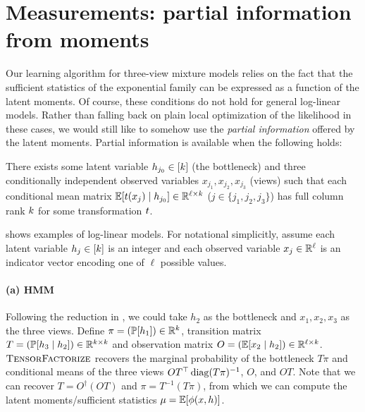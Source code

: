 \section{Measurements: partial information from moments} \label{sec:generalModels}

Our learning algorithm for three-view mixture models relies on the fact that
the sufficient statistics of the exponential family
can be expressed as a function of the latent moments.
Of course, these conditions do not hold for general log-linear models.
Rather than falling back on plain local optimization of the likelihood in these
cases, we would still like
to somehow use the \emph{partial information} offered by the latent moments.
Partial information is available when the following holds:
\begin{property}
  There exists some latent variable $h_{j_0} \in [k]$ (the bottleneck)
  and three conditionally independent observed variables $x_{j_1},x_{j_2},x_{j_3}$ (views) such that
  each conditional mean matrix $\mathbb{E}[t(x_{j}) \mid h_{j_0}] \in \mathbb{R}^{\ell \times k}$ ($j \in \{ j_1, j_2, j_3 \}$) has full column rank $k$
  for some transformation $t$.
\end{property}

 shows examples of log-linear models.
For notational simplicitly, assume each latent variable $h_j \in [k]$ is an integer
and each observed variable $x_j \in \mathbb{R}^\ell$ is an indicator vector encoding
one of $\ell$
possible values.


\paragraph{(a) HMM}
Following the reduction in \citet{anandkumar12moments},
we could take $h_2$ as the bottleneck and $x_1, x_2, x_3$ as the three views.
Define $\pi = (\mathbb{P}[h_1]) \in \mathbb{R}^{k}$,
transition matrix $T = (\mathbb{P}[h_3 \mid h_2]) \in \mathbb{R}^{k \times k}$
and observation matrix $O = (\mathbb{E}[x_2 \mid h_2]) \in \mathbb{R}^{\ell \times k}$.
$\text{\sc TensorFactorize}$ recovers the marginal probability of the bottleneck
$T \pi$ and conditional means of the three views
$O T^\top \operatorname*{diag}(T \pi)^{-1}$,
$O$,
and $O T$.
Note that we can recover $T = O^\dagger(OT)$ and $\pi = T^{-1} (T\pi)$,
from which we can compute the latent moments/sufficient statistics $\mu = \mathbb{E}[\phi(x,h)]$.

